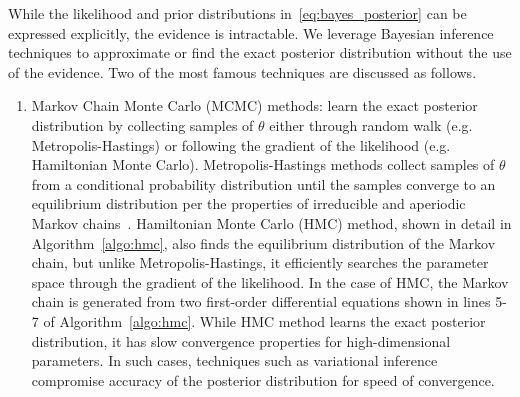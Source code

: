 While the likelihood and prior distributions in~\eqref{eq:bayes_posterior} can
be expressed explicitly, the evidence is intractable. We leverage Bayesian
inference techniques to approximate or find the exact posterior distribution
without the use of the evidence. Two of the most famous techniques are
discussed as follows.
\begin{enumerate}
  \item Markov Chain Monte Carlo (MCMC) methods: learn the exact posterior
  distribution by collecting samples of $\theta$ either through random walk
  (e.g. Metropolis-Hastings) or following the gradient of the likelihood (e.g.
  Hamiltonian Monte Carlo). Metropolis-Hastings methods collect samples of
  $\theta$ from a conditional probability distribution until the samples
  converge to an equilibrium distribution per the properties of irreducible and
  aperiodic Markov chains~\cite{gilks1995markov}. Hamiltonian Monte Carlo (HMC)
  method, shown in detail in Algorithm~\ref{algo:hmc}, also finds the
  equilibrium distribution of the Markov chain, but unlike Metropolis-Hastings,
  it efficiently searches the parameter space through the gradient of the
  likelihood. In the case of HMC, the Markov chain is generated from two
  first-order differential equations shown in lines 5-7 of
  Algorithm~\ref{algo:hmc}. While HMC method learns the exact posterior
  distribution, it has slow convergence properties for high-dimensional
  parameters. In such cases, techniques such as variational inference compromise
  accuracy of the posterior distribution for speed of convergence.
  

\end{enumerate}
